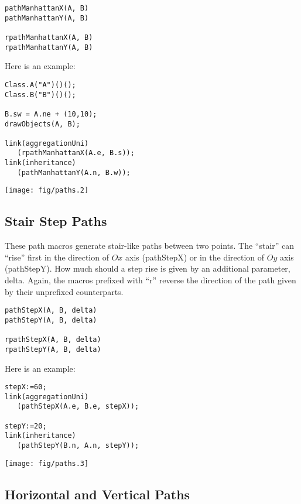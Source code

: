 \documentclass{article}
\newcommand{\code}{\ttfamily}
\begin{document}
\begin{verbatim}
pathManhattanX(A, B)
pathManhattanY(A, B)

rpathManhattanX(A, B)
rpathManhattanY(A, B)
\end{verbatim}

\pagebreak
Here is an example:

\begin{multicols}{2}
\begin{verbatim}
Class.A("A")()();
Class.B("B")()();

B.sw = A.ne + (10,10);
drawObjects(A, B);

link(aggregationUni)
   (rpathManhattanX(A.e, B.s));
link(inheritance)
   (pathManhattanY(A.n, B.w));
\end{verbatim}
\columnbreak
\hspace{1cm}\texttt{[image: fig/paths.2]}
\end{multicols}

\subsection{Stair Step Paths}

These path macros generate stair-like paths between two points.
The ``stair'' can ``rise'' first in the direction of $Ox$ axis ({\code pathStepX})
or in the direction of $Oy$ axis ({\code pathStepY}). How much should a step
rise is given by an additional parameter, {\code delta}. Again, the macros
prefixed with ``{\code r}'' reverse the direction of the path given by their
unprefixed counterparts.

\begin{verbatim}
pathStepX(A, B, delta)
pathStepY(A, B, delta)

rpathStepX(A, B, delta)
rpathStepY(A, B, delta)
\end{verbatim}

Here is an example:

\begin{multicols}{2}
\begin{verbatim}
stepX:=60;
link(aggregationUni)
   (pathStepX(A.e, B.e, stepX));

stepY:=20;
link(inheritance)
   (pathStepY(B.n, A.n, stepY));
\end{verbatim}
\columnbreak
\hspace{1cm}\texttt{[image: fig/paths.3]}
\end{multicols}

\subsection{Horizontal and Vertical Paths}
\end{document}
